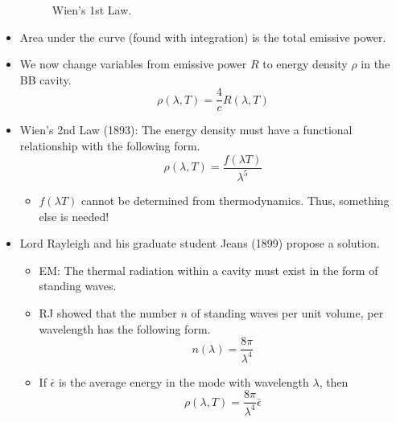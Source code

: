 \documentclass[../notes.tex]{subfiles}
\begin{document}
\begin{itemize}
\begin{figure}[h!]
        \caption{Wien's 1st Law.}
        \label{fig:WienLaw1}
    \end{figure}
    \item Area under the curve (found with integration) is the total emissive power.
    \item We now change variables from emissive power $R$ to energy density $\rho$ in the BB cavity.
    \begin{equation*}
        \rho(\lambda,T) = \frac{4}{c}R(\lambda,T)
    \end{equation*}
    \item Wien's 2nd Law (1893): The energy density must have a functional relationship with the following form.
    \begin{equation*}
        \rho(\lambda,T) = \frac{f(\lambda T)}{\lambda^5}
    \end{equation*}
    \begin{itemize}
        \item $f(\lambda T)$ cannot be determined from thermodynamics. Thus, something else is needed!
    \end{itemize}
    \item Lord Rayleigh and his graduate student Jeans (1899) propose a solution.
    \begin{itemize}
        \item EM: The thermal radiation within a cavity must exist in the form of standing waves.
        \item RJ showed that the number $n$ of standing waves per unit volume, per wavelength has the following form.
        \begin{equation*}
            n(\lambda) = \frac{8\pi}{\lambda^4}
        \end{equation*}
        \item If $\bar{\epsilon}$ is the average energy in the mode with wavelength $\lambda$, then
        \begin{equation*}
            \rho(\lambda,T) = \frac{8\pi}{\lambda^4}\bar{\epsilon}

\end{equation*}
\end{itemize}
\end{itemize}
\end{document}

